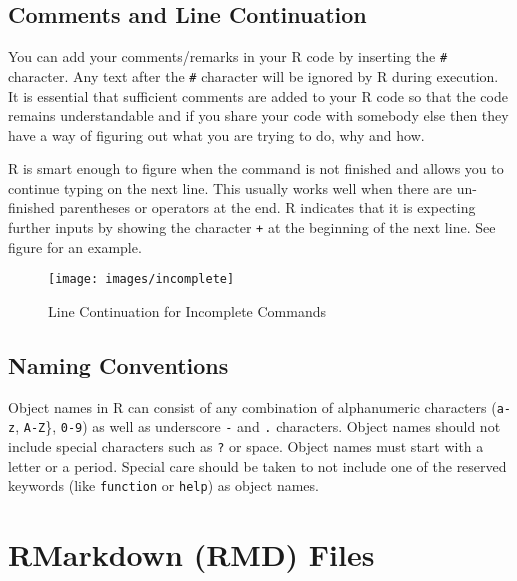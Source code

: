 \documentclass[
]{krantz}
\begin{document}
\hypertarget{comments-and-line-continuation}{%
\subsection{Comments and Line Continuation}\label{comments-and-line-continuation}}

You can add your comments/remarks in your R code by inserting the \texttt{\#} character. Any text after the \texttt{\#} character will be ignored by R during execution. It is essential that sufficient comments are added to your R code so that the code remains understandable and if you share your code with somebody else then they have a way of figuring out what you are trying to do, why and how.

R is smart enough to figure when the command is not finished and allows you to continue typing on the next line. This usually works well when there are un-finished parentheses or operators at the end. R indicates that it is expecting further inputs by showing the character \texttt{+} at the beginning of the next line. See figure for an example.

\begin{figure}

{\centering \texttt{[image: images/incomplete]} 

}

\caption{Line Continuation for Incomplete Commands}\label{fig:unnamed-chunk-10}
\end{figure}

\hypertarget{naming-conventions}{%
\subsection{Naming Conventions}\label{naming-conventions}}

Object names in R can consist of any combination of alphanumeric characters (\texttt{a-z}, \texttt{A-Z}\}, \texttt{0-9}) as well as underscore \texttt{-} and \texttt{.} characters. Object names should not include special characters such as \texttt{?} or space. Object names must start with a letter or a period. Special care should be taken to not include one of the reserved keywords (like \texttt{function} or \texttt{help}) as object names.

\hypertarget{rmarkdown-rmd-files}{%
\section{RMarkdown (RMD) Files}\label{rmarkdown-rmd-files}}
\end{document}
